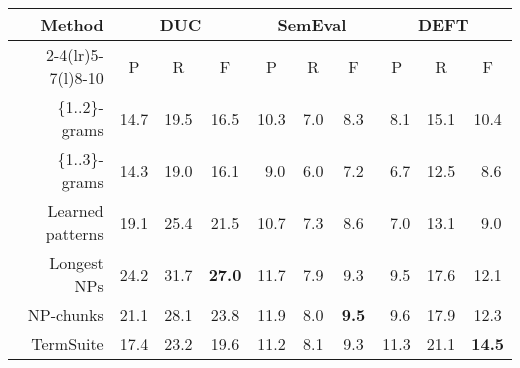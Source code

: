       \begin{table*}
        \centering
        \begin{tabular}{rccccccccc}
          \toprule
          \multirow{2}{*}[-2pt]{\textbf{Method}} & \multicolumn{3}{c}{\textbf{DUC}} & \multicolumn{3}{c}{\textbf{SemEval}} & \multicolumn{3}{c}{\textbf{DEFT}}\\
          \cmidrule(r){2-4}\cmidrule(lr){5-7}\cmidrule(l){8-10}
          & P & R & F & P & R & F & P & R & F\\
          \midrule
          \{1..2\}-grams & 14.7 & 19.5 & 16.5 & 10.3 & $~~$7.0 & $~~$8.3 & $~~$8.1 & 15.1 & 10.4\\
          \{1..3\}-grams & 14.3 & 19.0 & 16.1 & $~~$9.0 & $~~$6.0 & $~~$7.2 & $~~$6.7 & 12.5 & $~~$8.6\\
          Learned patterns & 19.1 & 25.4 & 21.5 & 10.7 & $~~$7.3 & $~~$8.6 & $~~$7.0 & 13.1 & $~~$9.0\\
          Longest NPs & 24.2 & 31.7 & \textbf{27.0} & 11.7 & $~~$7.9 & $~~$9.3 & $~~$9.5 & 17.6 & 12.1\\
          NP-chunks & 21.1 & 28.1 & 23.8 & 11.9 & $~~$8.0 & \textbf{$~~$9.5} & $~~$9.6 & 17.9 & 12.3\\
          TermSuite & 17.4 & 23.2 & 19.6 & 11.2 & $~~$8.1 & $~~$9.3 & 11.3 & 21.1 & \textbf{14.5}\\
          \bottomrule
        \end{tabular}
        \caption{Comparison of candidate extraction methods, when extracting 10
                 keyphrases with \textbf{TF-IDF}.
                 \label{tab:tfidf_results}}
      \end{table*}
